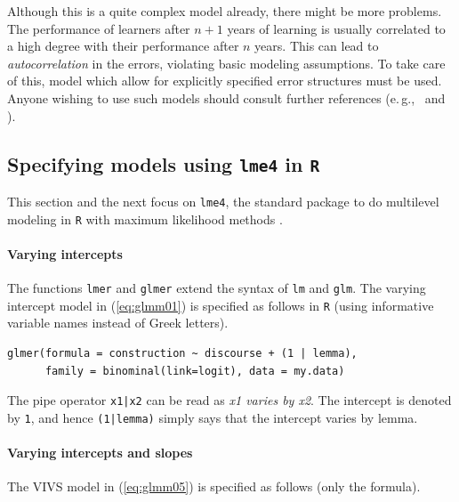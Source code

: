 \documentclass[a4paper,12pt]{article}
\newcommand{\eg}{e.\,g.,\ }
\begin{document}
Although this is a quite complex model already, there might be more problems.
The performance of learners after $n+1$ years of learning is usually correlated to a high degree with their performance after $n$ years.
This can lead to \textit{autocorrelation} in the errors, violating basic modeling assumptions.
To take care of this, model which allow for explicitly specified error structures must be used.
Anyone wishing to use such models should consult further references (\eg \citealt{Fox2016} and \citealt{ZuurEa2009}).

\subsection{Specifying models using \texttt{lme4} in \texttt{R}}
\label{sec:specifyingmodelsusinglme4inr}

This section and the next focus on \texttt{lme4}, the standard package to do multilevel modeling in \texttt{R} with maximum likelihood methods \citep{BatesEa2015}.

\paragraph{Varying intercepts}

The functions \texttt{lmer} and \texttt{glmer} extend the syntax of \texttt{lm} and \texttt{glm}.
The varying intercept model in (\ref{eq:glmm01}) is specified as follows in \texttt{R} (using informative variable names instead of Greek letters).

\vspace{0.5\baselineskip}

\begin{lstlisting}
glmer(formula = construction ~ discourse + (1 | lemma),
      family = binominal(link=logit), data = my.data)
\end{lstlisting}

The pipe operator \texttt{x1|x2} can be read as \textit{x1 varies by x2}.
The intercept is denoted by \texttt{1}, and hence \texttt{(1|lemma)} simply says that the intercept varies by lemma.

\paragraph{Varying intercepts and slopes}

The VIVS model in (\ref{eq:glmm05}) is specified as follows (only the formula).

\vspace{0.5\baselineskip}
\end{document}
